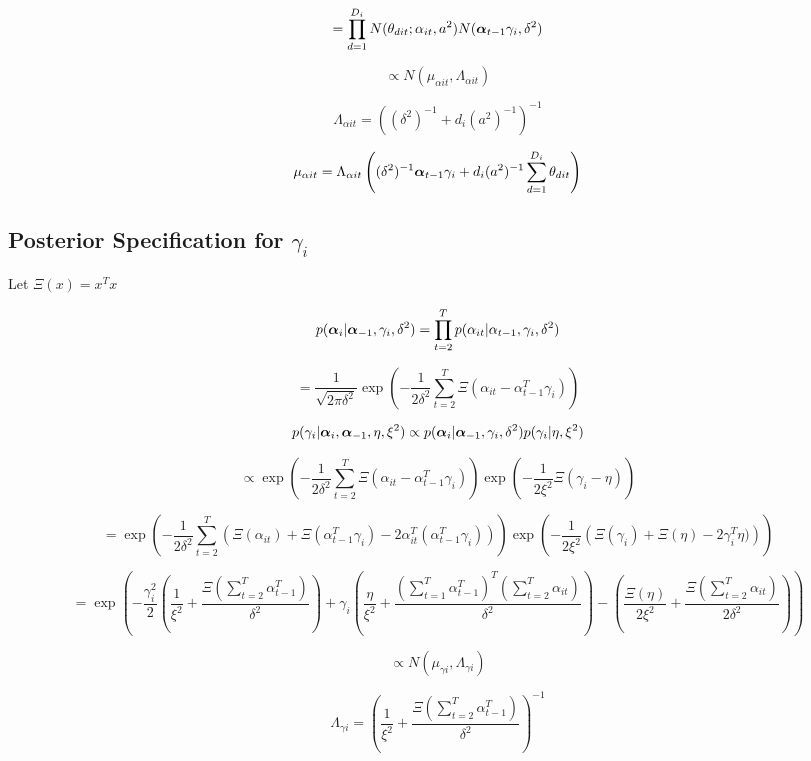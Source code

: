\documentclass[a4paper]{article}
\begin{document}
\[= \prod_{d=1}^{D_i} N(\theta_{dit};\alpha_{it}, a^2) N(\text{\boldmath$\alpha$}_{t-1}\gamma_i, \delta^2)\]

\[\propto N(\mu_{\alpha i t}, \Lambda_{\alpha i t})\]

\[\Lambda_{\alpha i t} = ((\delta^2)^{-1} + d_i (a^2)^{-1})^{-1}\]

\[\mu_{\alpha i t} = \Lambda_{\alpha i t} \left((\delta^2)^{-1}\text{\boldmath$\alpha$}_{t-1} \gamma_i + d_i (a^2)^{-1} \sum_{d=1}^{D_i} \theta_{dit}\right) \]

\subsection{Posterior Specification for $\gamma_i$}

Let $\Xi(x) = x^Tx$

\[p(\text{\boldmath$\alpha$}_i | \text{\boldmath$\alpha$}_{-1}, \gamma_i, \delta^2) = \prod_{t=2}^T p(\alpha_{it} | \alpha_{t-1}, \gamma_i, \delta^2)\]

\[= \frac{1}{\sqrt{2 \pi \delta^2}} \exp\left(-\frac{1}{2\delta^2} \sum_{t=2}^T \Xi\left(\alpha_{it} - \alpha_{t-1}^T \gamma_i\right)\right)\]

\[p(\gamma_i | \text{\boldmath$\alpha$}_{i}, \text{\boldmath$\alpha$}_{-1}, \eta, \xi^2) \propto p(\text{\boldmath$\alpha$}_i | \text{\boldmath$\alpha$}_{-1}, \gamma_i, \delta^2) p(\gamma_i | \eta, \xi^2)\]

\[\propto \exp\left(-\frac{1}{2 \delta^2} \sum_{t=2}^T \Xi\left(\alpha_{it} - \alpha_{t-1}^T \gamma_i\right)\right) \exp\left(-\frac{1}{2\xi^2}\Xi\left(\gamma_i - \eta\right)\right)\]

\[= \exp\left(-\frac{1}{2 \delta^2} \sum_{t=2}^T \left(\Xi(\alpha_{it}) + \Xi\left(\alpha_{t-1}^T \gamma_i\right) - 2 \alpha_{it}^T (\alpha_{t-1}^T \gamma_i) \right)\right) \exp\left(-\frac{1}{2\xi^2}\left(\Xi(\gamma_i) + \Xi(\eta) - 2 \gamma_i^T \eta)\right)\right)\]

\[= \exp\left(- \frac{\gamma_i^2}{2}\left(\frac{1}{\xi^2} + \frac{\Xi\left(\sum_{t=2}^T \alpha_{t-1}^T\right)}{\delta^2}\right) + \gamma_i \left(\frac{\eta}{\xi^2} + \frac{\left(\sum_{t=1}^T \alpha_{t-1}^T\right)^T \left(\sum_{t=2}^T \alpha_{it}\right)}{\delta^2}\right) - \left(\frac{\Xi(\eta)}{2\xi^2} + \frac{\Xi\left(\sum_{t=2}^T \alpha_{it}\right)}{2 \delta^2}\right)\right)\]

\[\propto N(\mu_{\gamma i}, \Lambda_{\gamma i})\]

\[\Lambda_{\gamma i} = \left(\frac{1}{\xi^2}+ \frac{\Xi\left(\sum_{t=2}^T \alpha_{t-1}^T\right)}{\delta^2}\right)^{-1}\]
\end{document}
